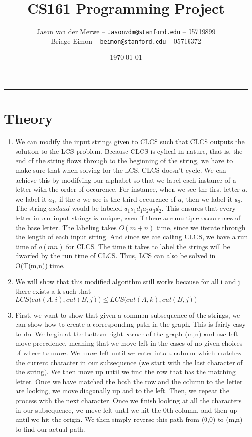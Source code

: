 \documentclass[12pt]{article}
\title{CS161 Programming Project}
\author{Jason van der Merwe -- \texttt{Jasonvdm@stanford.edu} -- 05719899\\
Bridge Eimon -- \texttt{beimon@stanford.edu} -- 05716372}
\date{\today}
\begin{document}
\maketitle

\vspace{-0.3in}
\rule{\linewidth}{0.4pt}


\section*{Theory}
\begin{enumerate}
    \item We can modify the input strings given to CLCS such that CLCS outputs the solution to the LCS problem. Because CLCS is cylical in nature, that is, the end of the string flows through to the beginning of the string, we have to make sure that when solving for the LCS, CLCS doesn't cycle. We can achieve this by modifying our alphabet so that we label each instance of a letter with the order of occurence. For instance, when we see the first letter $a$, we label it $a_1$, if the $a$ we see is the third occurence of $a$, then we label it $a_3$. The string $asdaad$ would be labeled $a_1s_1d_1a_2a_3d_2$. This ensures that every letter in our input strings is unique, even if there are multiple occurences of the base letter. The labeling takes $O(m+n)$ time, since we iterate through the length of each input string. And since we are calling CLCS, we have a run time of $o(mn)$ for CLCS. The time it takes to label the strings will be dwarfed by the run time of CLCS. Thus, LCS can also be solved in O(T(m,n)) time.\\
    \item We will show that this modified algorithm still works because for all i and j there exists a k such that $LCS\big(cut(A,i), cut(B,j)\big) \le LCS\big(cut(A,k), cut(B,j)\big)$ 
    
    \item First, we want to show that given a common subsequence of the strings, we can show how to create a corresponding path in the graph. This is fairly easy to do. We begin at the bottom right corner of the graph (m,n) and use left-move precedence, meaning that we move left in the cases of no given choices of where to move. We move left until we enter into a column which matches the current character in our subsequence (we start with the last character of the string). We then move up until we find the row that has the matching letter. Once we have matched the both the row and the column to the letter are looking, we move diagonally up and to the left. Then, we repeat the process with the next character. Once we finish looking at all the characters in our subsequence, we move left until we hit the 0th column, and then up until we hit the origin. We then simply reverse this path from (0,0) to (m,n) to find our actual path.\\


\end{enumerate}
\end{document}
